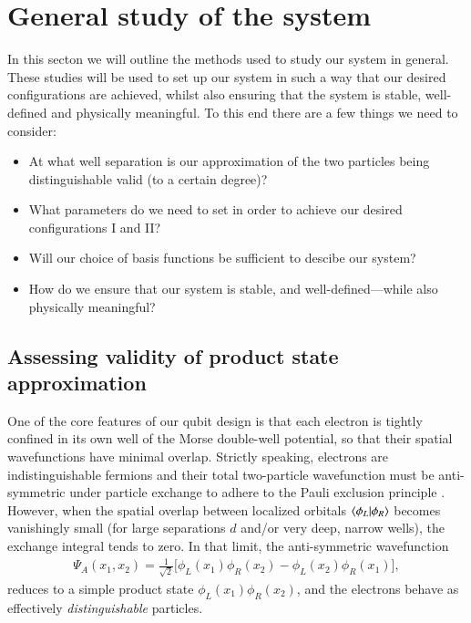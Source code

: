 \documentclass{subfiles}
\begin{document}
\section{General study of the system}
In this secton we will outline the methods used to study our system in general. These studies will be used to set up our system in such a way that our desired configurations are achieved, whilst also ensuring that the system is stable, well-defined and physically meaningful. To this end there are a few things we need to consider:
\begin{itemize}
    \item At what well separation is our approximation of the two particles being distinguishable valid (to a certain degree)?
    \item What parameters do we need to set in order to achieve our desired configurations I and II?
    \item Will our choice of basis functions be sufficient to descibe our system?
    \item How do we ensure that our system is stable, and well-defined—while also physically meaningful?
\end{itemize}
\subsection{Assessing validity of product state approximation}\label{sec:distinguishability} %
One of the core features of our qubit design is that each electron is tightly confined in its own well of the Morse double-well potential, so that their spatial wavefunctions have minimal overlap. Strictly speaking, electrons are indistinguishable fermions and their total two-particle wavefunction must be anti-symmetric under particle exchange to adhere to the Pauli exclusion principle \cite{berera2021quantum, griffiths2018introduction}. However, when the spatial overlap between localized orbitals $\braket{\phi_L|\phi_R}$  becomes vanishingly small (for large separations $d$ and/or very deep, narrow wells), the exchange integral tends to zero. In that limit, the anti-symmetric wavefunction
\begin{align*}
    \Psi_A(x_1, x_2) = \frac{1}{\sqrt{2}} \bigg[\phi_L(x_1)\phi_R(x_2) - \phi_L(x_2)\phi_R(x_1)\bigg],
\end{align*}
reduces to a simple product state $\phi_L(x_1)\phi_R(x_2)$, and the electrons behave as effectively \emph{distinguishable} particles. 
\end{document}
